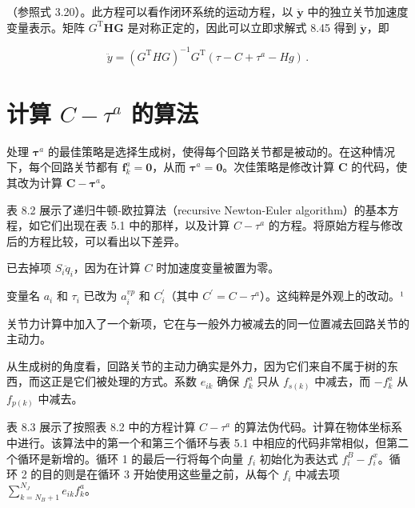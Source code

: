 \documentclass[10pt,a4paper]{book}
\theoremstyle{thmstyle} %
\theoremstyle{defstyle} %
\theoremstyle{prostyle} %
\begin{document}
（参照式 3.20）。此方程可以看作闭环系统的运动方程，以 $\ddot{\boldsymbol{y}}$ 中的独立关节加速度变量表示。矩阵 $G^{\mathrm{T}}\boldsymbol{H}\boldsymbol{G}$ 是对称正定的，因此可以立即求解式 8.45 得到 $\ddot{\boldsymbol{y}}$，即



$$
\ddot { y } = ( G ^{\mathrm { T} } H G ) ^{- 1} G ^{\mathrm { T} } ( \tau - C + \tau ^{a} - H g ) \, .
$$



\section{计算 $C - \tau^{a}$ 的算法}





处理 $\boldsymbol{\tau}^{a}$ 的最佳策略是选择生成树，使得每个回路关节都是被动的。在这种情况下，每个回路关节都有 $\boldsymbol{f}_{k}^{a}=\mathbf{0}$，从而 $\boldsymbol{\tau}^{a}=\mathbf{0}$。次佳策略是修改计算 $\boldsymbol{C}$ 的代码，使其改为计算 $\boldsymbol{C}-\boldsymbol{\tau}^{a}$。





表 8.2 展示了递归牛顿-欧拉算法（recursive Newton-Euler algorithm）的基本方程，如它们出现在表 5.1 中的那样，以及计算 $C - \tau^{a}$ 的方程。将原始方程与修改后的方程比较，可以看出以下差异。



已去掉项 $S_{i} \ddot{q}_{i}$，因为在计算 $C$ 时加速度变量被置为零。



变量名 $a_{i}$ 和 $\tau_{i}$ 已改为 $a_{i}^{vp}$ 和 $C_{i}^{\prime}$（其中 $C^{\prime} = C - \tau^{a}$）。这纯粹是外观上的改动。¹



关节力计算中加入了一个新项，它在与一般外力被减去的同一位置减去回路关节的主动力。



从生成树的角度看，回路关节的主动力确实是外力，因为它们来自不属于树的东西，而这正是它们被处理的方式。系数 $e_{ik}$ 确保 $f_{k}^{a}$ 只从 $f_{s(k)}$ 中减去，而 $-f_{k}^{a}$ 从 $f_{p(k)}$ 中减去。



表 8.3 展示了按照表 8.2 中的方程计算 $C - \tau^{a}$ 的算法伪代码。计算在物体坐标系中进行。该算法中的第一个和第三个循环与表 5.1 中相应的代码非常相似，但第二个循环是新增的。循环 1 的最后一行将每个向量 $f_{i}$ 初始化为表达式 $f_{i}^{B} - f_{i}^{x}$。循环 2 的目的则是在循环 3 开始使用这些量之前，从每个 $f_{i}$ 中减去项 $\sum_{k=N_{B}+1}^{N_{J}} e_{ik} f_{k}^{a}$。
\end{document}
